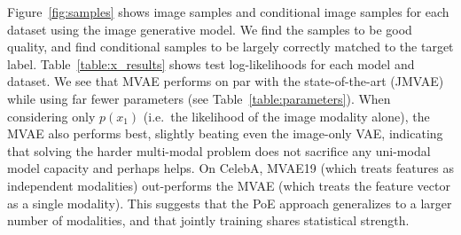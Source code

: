 \label{sec:results}
Figure~\ref{fig:samples} shows image samples and conditional image samples for each dataset using the image generative model.
We find the samples to be good quality, and find conditional samples to be largely correctly matched to the target label.
Table~\ref{table:x_results} shows test log-likelihoods for each model and dataset. We see that MVAE performs on par with the state-of-the-art (JMVAE) while using far fewer parameters (see Table~\ref{table:parameters}).
When considering only $p(x_1)$ (i.e.~the likelihood of the image modality alone), the MVAE also performs best, slightly beating even the image-only VAE, indicating that solving the harder multi-modal problem does not sacrifice any uni-modal model capacity and perhaps helps. On CelebA, MVAE19 (which treats features as independent modalities) out-performs the MVAE (which treats the feature vector as a single modality). This suggests that the PoE approach generalizes to a larger number of modalities, and that jointly training shares statistical strength. 


